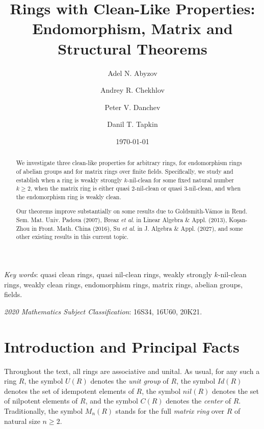 \documentclass{amsart}
\date\today
\author[A. N. Abyzov]{Adel N. Abyzov}
\author[A. R. Chekhlov]{Andrey R. Chekhlov}
\author[P. V. Danchev]{Peter V. Danchev}
\author[D. T. Tapkin]{Danil T. Tapkin}
\theoremstyle{definition}
\theoremstyle{remark}
\numberwithin{equation}{section}
\begin{document}
\title[Rings with Clean-Like Properties ...]{Rings with Clean-Like Properties: \\ Endomorphism, Matrix and Structural Theorems}

\maketitle

\begin{abstract} We investigate three clean-like properties for arbitrary rings, for endomorphism rings of abelian groups and for matrix rings over finite fields. Specifically, we study and establish when a ring is weakly strongly $k$-nil-clean for some fixed natural number $k\geq 2$, when the matrix ring is either quasi $2$-nil-clean or quasi $3$-nil-clean, and when the endomorphism ring is weakly clean.

Our theorems improve substantially on some results due to Goldsmith-V\'amos in Rend. Sem. Mat. Univ. Padova (2007), Breaz {\it et al}. in Linear Algebra \& Appl. (2013), Ko\c{s}an-Zhou in Front. Math. China (2016), Su {\it et al}. in J. Algebra \& Appl. (2027), and some other existing results in this current topic.
\end{abstract}


\bigskip

{\footnotesize \textit{Key words}: quasi clean rings, quasi nil-clean rings, weakly strongly $k$-nil-clean rings, weakly clean rings, endomorphism rings, matrix rings, abelian groups, fields.}

{\footnotesize \textit{2020 Mathematics Subject Classification}: 16S34, 16U60, 20K21.}


\section{Introduction and Principal Facts}

Throughout the text, all rings are associative and unital. As usual, for any such a ring $R$, the symbol $U(R)$ denotes the {\it unit group} of $R$, the symbol $Id(R)$ denotes the set of idempotent elements of $R$, the symbol $nil(R)$ denotes the set of nilpotent elements of $R$, and the symbol $C(R)$ denotes the {\it center} of $R$. Traditionally, the symbol $M_n(R)$ stands for the full {\it matrix ring} over $R$ of natural size $n\geq 2$.
\end{document}
